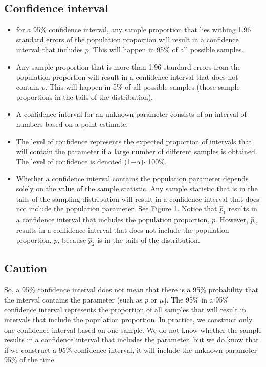 \documentclass{report}
\begin{document}
        \subsection*{Confidence interval}
        \bigbreak \noindent 
        \begin{itemize}
          \item for a 95\% confidence interval, any sample proportion that lies withing 1.96 standard errors of the population proportion will result in a confidence interval that includes $p $. This will happen in 95\% of all possible samples.
          \item Any sample proportion that is more than 1.96 standard errors from the population proportion will result in a confidence interval that does not contain $p $. This will happen in 5\% of all possible samples (those sample proportions in the tails of the distribution).
          \item A confidence interval for an unknown parameter consists of an interval of numbers based on a point estimate.
          \item The level of confidence represents the expected proportion of intervals that will contain the parameter if a large number of different samples is obtained. The level of confidence is denoted (1−$\alpha $)$\cdot $ 100\%.
          \item Whether a confidence interval contains the population parameter depends solely on the value of the sample statistic. Any sample statistic that is in the tails of the sampling distribution will result in a confidence interval that does not include the population parameter. See Figure 1. Notice that $\hat{p}_1$ results in a confidence interval that includes the population proportion, $p$. However, $\hat{p}_2$ results in a confidence interval that does not include the population proportion, $p$, because $\hat{p}_2$ is in the tails of the distribution.
        \end{itemize}

        \subsection*{Caution}
        \bigbreak \noindent 
        So, a 95\% confidence interval does not mean that there is a 95\% probability that the interval contains the parameter (such as $p $ or $\mu$). The 95\% in a 95\% confidence interval represents the proportion of all samples that will result in intervals that include the population proportion.
        \bigbreak \noindent 
        In practice, we construct only one confidence interval based on one sample. We do not know whether the sample results in a confidence interval that includes the parameter, but we do know that if we construct a 95\% confidence interval, it will include the unknown parameter 95\% of the time.
\end{document}
